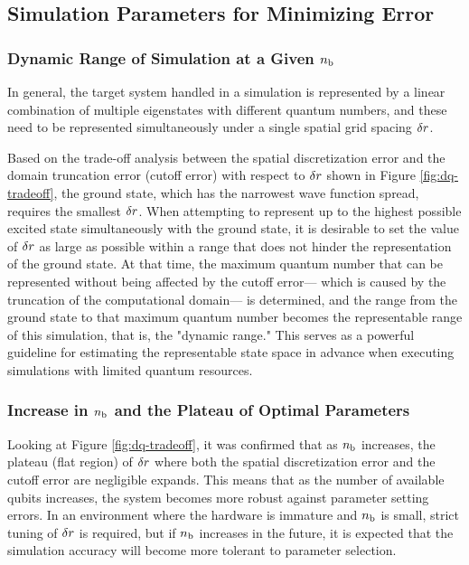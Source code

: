 \documentclass[jctc-draft.tex]{subfiles}
\begin{document}
\subsection{Simulation Parameters for Minimizing Error}
\label{sec:parameter-selection-for-minimum-error-analysis}
\subsubsection{Dynamic Range of Simulation at a Given $n_{\mathrm{b}}$}
In general, the target system handled in a simulation is represented by a linear
combination of multiple eigenstates with different quantum numbers, and these
need to be represented simultaneously under a single spatial grid spacing
$\delta r$.

Based on the trade-off analysis between the spatial discretization error and the
domain truncation error (cutoff error) with respect to $\delta r$ shown in Figure
\ref{fig:dq-tradeoff}, the ground state, which has the narrowest wave function
spread, requires the smallest $\delta r$. When attempting to represent up to the
highest possible excited state simultaneously with the ground state, it is
desirable to set the value of $\delta r$ as large as possible within a range that
does not hinder the representation of the ground state. At that time, the
maximum quantum number that can be represented without being affected by the
cutoff error--- which is caused by the truncation of the computational domain---
is determined, and the range from the ground state to that maximum quantum
number becomes the representable range of this simulation, that is, the "dynamic
range." This serves as a powerful guideline for estimating the representable
state space in advance when executing simulations with limited quantum
resources.

\subsubsection{Increase in $n_{\mathrm{b}}$ and the Plateau of Optimal Parameters}
Looking at Figure \ref{fig:dq-tradeoff}, it was confirmed that as $n_{\mathrm{b}}$
increases, the plateau (flat region) of $\delta r$ where both the spatial
discretization error and the cutoff error are negligible expands. This means
that as the number of available qubits increases, the system becomes more robust
against parameter setting errors. In an environment where the hardware is
immature and $n_{\mathrm{b}}$ is small, strict tuning of $\delta r$ is required, but if
$n_{\mathrm{b}}$ increases in the future, it is expected that the simulation accuracy will
become more tolerant to parameter selection.
\end{document}
